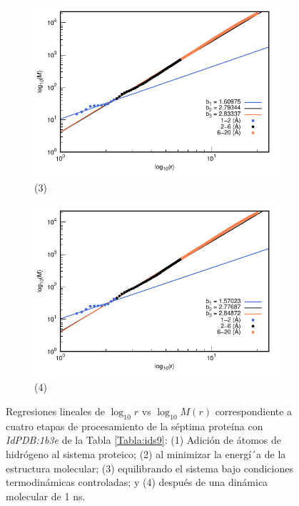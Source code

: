 \begin{figure}[H]
	\vspace{0cm} %
	
	\hspace{-0.3cm} 
	\begin{subfigure}{0.49\textwidth}
		\centering
		\includegraphics[width=\linewidth,page=1]{graphs/PDBs/1b3e/1b3eEq.pdf}
		\caption{(3)}
	\end{subfigure}
	\hspace{0.2cm}
	\begin{subfigure}{0.49\textwidth} %
		\centering
		\includegraphics[width=\linewidth,page=1]{graphs/PDBs/1b3e/1b3e1ns.pdf}
		\caption{(4)}
	\end{subfigure}
	\caption{Regresiones lineales de $\log_{10}r$ vs $\log_{10}M(r)$ correspondiente a cuatro etapas de procesamiento de la s\'{e}ptima prote\'{i}na con \textit{IdPDB:1b3e} de la Tabla \ref{Tabla:ids9}: (1) Adici\'{o}n de \'{a}tomos de hidr\'{o}geno al sistema proteico; (2) al minimizar la energ\'{i´}a de la estructura molecular; (3) equilibrando el sistema bajo condiciones termodin\'{a}micas controladas; y (4) despu\'{e}s de una din\'{a}mica molecular de 1 ns.}
	\label{fig:1b3e}
\end{figure}

